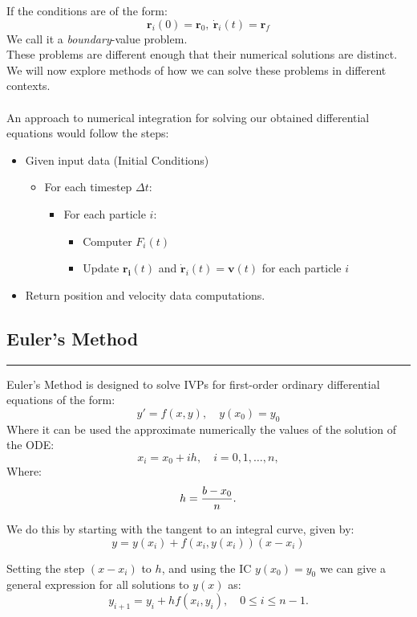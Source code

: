 \documentclass[hidelinks, 11pt, dvipsnames]{article}
\newcommand{\psubsection}[1]{{
    \begin{center}
        \section*{\Large #1}
        \noindent \rule{17cm}{0.2pt}
    \end{center}
}}
\begin{document}
    If the conditions are of the form:
    $$ \mathbf{r}_i(0) = \mathbf{r}_0,\ \mathbf{\dot{r}}_i(t) = \mathbf{r}_f $$
    We call it a \emph{boundary}-value problem.\\

    These problems are different enough that their numerical solutions are distinct.\\

    We will now explore methods of how we can solve these problems in different contexts.\\
    \\

    An approach to numerical integration for solving our obtained differential equations would follow the steps:
    \begin{itemize}
        \item Given input data (Initial Conditions)
        \begin{itemize}
            \item For each timestep $\Delta t$:
            \begin{itemize}
                \item For each particle $i$:
                \begin{itemize}
                    \item Computer $F_i(t)$
                    \item Update $\mathbf{r_i}(t)$ and $\mathbf{\dot{r}}_i(t) = \mathbf{v}(t)$ for each particle $i$
                \end{itemize}
            \end{itemize}
        \end{itemize}
        \item Return position and velocity data computations.
    \end{itemize}
    \newpage

    \psubsection{Euler's Method}
    Euler's Method is designed to solve IVPs for first-order ordinary differential equations of the form:
    $$ \label{eq:3.1.1} y'=f(x,y),\quad y(x_0)=y_0 $$
    Where it can be used the approximate numerically the values of the solution of the ODE:
    $$ x_i=x_0+ih,\quad i=0,1, \dots,n, \nonumber $$
    Where:
    $$ h={b-x_0\over n}.\nonumber $$

    We do this by starting with the tangent to an integral curve, given by:
    $$ \label{eq:3.1.2} y=y(x_i)+f(x_i,y(x_i))(x-x_i) $$

    Setting the step $(x-x_i)$ to $h$, and using the IC $y(x_0) = y_0$ we can give a general expression for all solutions to $y(x)$ as:
    $$ \label{eq:3.1.4} y_{i+1}=y_i+hf(x_i,y_i),\quad 0\le i\le n-1. $$
\end{document}
